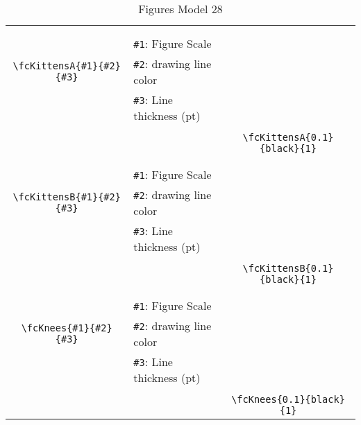 \documentclass[x11names]{article}
\begin{document}
\begin{table}[H]
\begin{tabular}{|c|l|c|}
	&&\multirow{5}{*}{\fcKittensA{0.1}{black}{1}}\\	&&\\	&\verb|#1|: Figure Scale &\\	\verb|\fcKittensA{#1}{#2}{#3}|&	\verb|#2|: drawing line color &\\	&\verb|#3|: Line thickness (pt) &\\ &&\\&&	\verb|\fcKittensA{0.1}{black}{1}|\\\hline 	
	&&\multirow{5}{*}{\fcKittensB{0.1}{black}{1}}\\	&&\\	&\verb|#1|: Figure Scale &\\	\verb|\fcKittensB{#1}{#2}{#3}|&	\verb|#2|: drawing line color &\\	&\verb|#3|: Line thickness (pt) &\\ &&\\&&	\verb|\fcKittensB{0.1}{black}{1}|\\\hline 	
	&&\multirow{5}{*}{\fcKnees{0.1}{black}{1}}\\	&&\\	&\verb|#1|: Figure Scale &\\	\verb|\fcKnees{#1}{#2}{#3}|&	\verb|#2|: drawing line color &\\	&\verb|#3|: Line thickness (pt) &\\ &&\\&&	\verb|\fcKnees{0.1}{black}{1}|\\\hline 	\hline\end{tabular}\caption{Figures Model 28}\label{tab28}\end{table}
\end{document}
